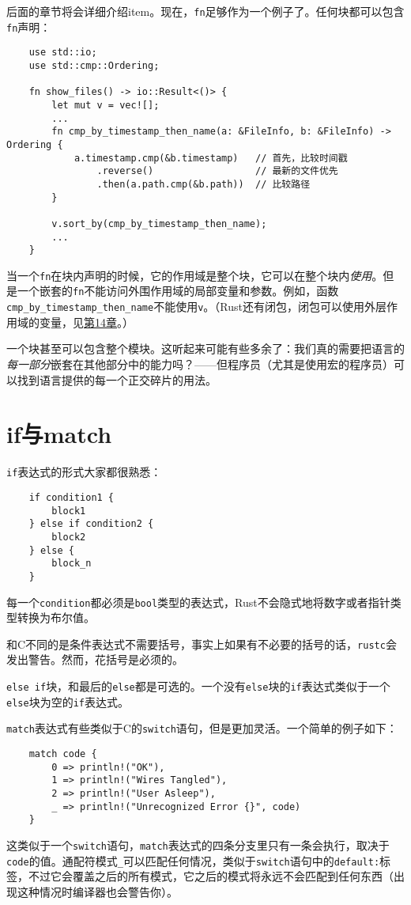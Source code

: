 后面的章节将会详细介绍item。现在，\texttt{fn}足够作为一个例子了。任何块都可以包含\texttt{fn}声明：
\begin{verbatim}
    use std::io;
    use std::cmp::Ordering;

    fn show_files() -> io::Result<()> {
        let mut v = vec![];
        ...
        fn cmp_by_timestamp_then_name(a: &FileInfo, b: &FileInfo) -> Ordering {
            a.timestamp.cmp(&b.timestamp)   // 首先，比较时间戳 
                .reverse()                  // 最新的文件优先
                .then(a.path.cmp(&b.path))  // 比较路径
        }

        v.sort_by(cmp_by_timestamp_then_name);
        ...
    }
\end{verbatim}

当一个\texttt{fn}在块内声明的时候，它的作用域是整个块，它可以在整个块内\emph{使用}。但是一个嵌套的\texttt{fn}不能访问外围作用域的局部变量和参数。例如，函数\texttt{cmp\_by\_timestamp\_then\_name}不能使用\texttt{v}。（Rust还有闭包，闭包可以使用外层作用域的变量，见\hyperref[ch14]{第14章}。）

一个块甚至可以包含整个模块。这听起来可能有些多余了：我们真的需要把语言的\emph{每一部分}嵌套在其他部分中的能力吗？——但程序员（尤其是使用宏的程序员）可以找到语言提供的每一个正交碎片的用法。

\section{if与match}

\texttt{if}表达式的形式大家都很熟悉：
\begin{verbatim}
    if condition1 {
        block1
    } else if condition2 {
        block2
    } else {
        block_n
    }
\end{verbatim}

每一个\texttt{condition}都必须是\texttt{bool}类型的表达式，Rust不会隐式地将数字或者指针类型转换为布尔值。

和C不同的是条件表达式不需要括号，事实上如果有不必要的括号的话，\texttt{rustc}会发出警告。然而，花括号是必须的。

\texttt{else if}块，和最后的\texttt{else}都是可选的。一个没有\texttt{else}块的\texttt{if}表达式类似于一个\texttt{else}块为空的\texttt{if}表达式。

\texttt{match}表达式有些类似于C的\texttt{switch}语句，但是更加灵活。一个简单的例子如下：
\begin{verbatim}
    match code {
        0 => println!("OK"),
        1 => println!("Wires Tangled"),
        2 => println!("User Asleep"),
        _ => println!("Unrecognized Error {}", code)
    }
\end{verbatim}
这类似于一个\texttt{switch}语句，\texttt{match}表达式的四条分支里只有一条会执行，取决于\texttt{code}的值。通配符模式\texttt{\_}可以匹配任何情况，类似于\texttt{switch}语句中的\texttt{default:}标签，不过它会覆盖之后的所有模式，它之后的模式将永远不会匹配到任何东西（出现这种情况时编译器也会警告你）。

